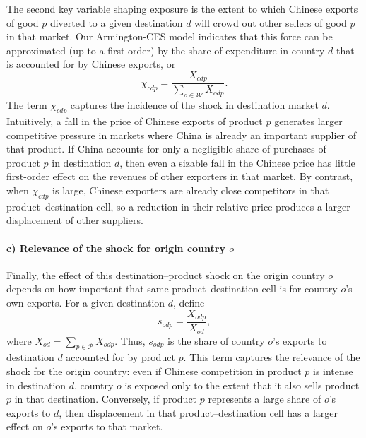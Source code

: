 \documentclass[english,12pt]{article}
\theoremstyle{definition}
\begin{document}
The second key variable shaping exposure is the extent to which Chinese
exports of good $p$ diverted to a given destination $d$ will crowd out other
sellers of good $p$ in that market. Our Armington-CES model indicates that
this force can be approximated (up to a first order) by the share of
expenditure in country $d$ that is accounted for by Chinese exports, or 
\begin{equation}
\chi _{cdp}=\frac{X_{cdp}}{\sum\nolimits_{o\in \mathcal{W}}X_{odp}}.
\label{eq: China Absorption Share}
\end{equation}
The term $\chi_{cdp}$ captures the incidence of the shock in destination market $d$. Intuitively, a fall in the price of Chinese exports of product $p$ generates larger competitive pressure in markets where China is already an important supplier of that product. If China accounts for only a negligible share of purchases of product $p$ in destination $d$, then even a sizable fall in the Chinese price has little first-order effect on the revenues of other exporters in that market. By contrast, when $\chi_{cdp}$ is large, Chinese exporters are already close competitors in that product--destination cell, so a reduction in their relative price produces a larger displacement of other suppliers.

\paragraph{c) Relevance of the shock for origin country $o$}

Finally, the effect of this destination--product shock on the origin country $o$ depends on how important that same product--destination cell is for country $o$'s own exports. For a given destination $d$, define
\begin{equation}
s_{odp}=\frac{X_{odp}}{X_{od}}, \label{eq: o Export Share}
\end{equation}
where $X_{od}=\sum_{p\in\mathcal{P}}X_{odp}$. Thus, $s_{odp}$ is the share of country $o$'s exports to destination $d$ accounted for by product $p$. This term captures the relevance of the shock for the origin country: even if Chinese competition in product $p$ is intense in destination $d$, country $o$ is exposed only to the extent that it also sells product $p$ in that destination. Conversely, if product $p$ represents a large share of $o$'s exports to $d$, then displacement in that product--destination cell has a larger effect on $o$'s exports to that market.
\end{document}
